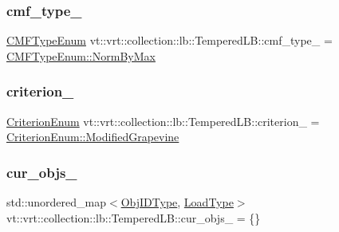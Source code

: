 \subsubsection{\texorpdfstring{cmf\+\_\+type\+\_\+}{cmf\_type\_}}
{\footnotesize\ttfamily \hyperlink{namespacevt_1_1vrt_1_1collection_1_1lb_ada1e381e6b19ba9f8277d4f698445404}{C\+M\+F\+Type\+Enum} vt\+::vrt\+::collection\+::lb\+::\+Tempered\+L\+B\+::cmf\+\_\+type\+\_\+ = \hyperlink{namespacevt_1_1vrt_1_1collection_1_1lb_ada1e381e6b19ba9f8277d4f698445404a2a17cd13e37fb3cacfea703c5edc3680}{C\+M\+F\+Type\+Enum\+::\+Norm\+By\+Max}\hspace{0.3cm}{\ttfamily [private]}}

\mbox{\label{structvt_1_1vrt_1_1collection_1_1lb_1_1_tempered_l_b_a808bb3c7d3bdf1ecfc8fe8cb24848047}} 
\subsubsection{\texorpdfstring{criterion\+\_\+}{criterion\_}}
{\footnotesize\ttfamily \hyperlink{namespacevt_1_1vrt_1_1collection_1_1lb_a4e454750e102cf5404d5ac151148951c}{Criterion\+Enum} vt\+::vrt\+::collection\+::lb\+::\+Tempered\+L\+B\+::criterion\+\_\+ = \hyperlink{namespacevt_1_1vrt_1_1collection_1_1lb_a4e454750e102cf5404d5ac151148951caf2d66de88187d7c4c75884f5605ae168}{Criterion\+Enum\+::\+Modified\+Grapevine}\hspace{0.3cm}{\ttfamily [private]}}

\mbox{\label{structvt_1_1vrt_1_1collection_1_1lb_1_1_tempered_l_b_adfb7a798dc9963a4d7649b44724ce857}} 
\subsubsection{\texorpdfstring{cur\+\_\+objs\+\_\+}{cur\_objs\_}}
{\footnotesize\ttfamily std\+::unordered\+\_\+map$<$\hyperlink{structvt_1_1vrt_1_1collection_1_1lb_1_1_base_l_b_a790b22acf448880599724749cdc4e9b3}{Obj\+I\+D\+Type}, \hyperlink{namespacevt_a8fb51741340b87d7aaee0bef60e9896b}{Load\+Type}$>$ vt\+::vrt\+::collection\+::lb\+::\+Tempered\+L\+B\+::cur\+\_\+objs\+\_\+ = \{\}\hspace{0.3cm}{\ttfamily [private]}}

